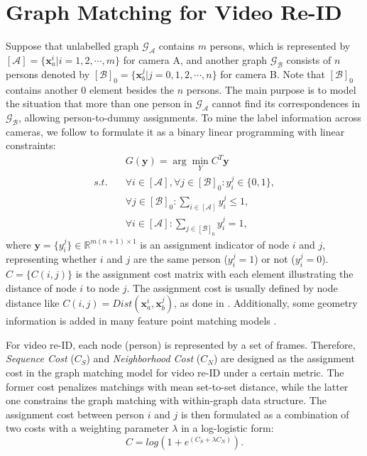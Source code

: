 \documentclass[10pt,twocolumn,letterpaper]{article}
\begin{document}
\section{Graph Matching for Video Re-ID}\label{sec:gm}
Suppose that unlabelled graph $\mathcal{G_A}$ contains $m$ persons, which is represented by $[\mathcal{A}] = \{\mathbf{x}^{i}_{a}|i = 1,2,\cdots,m\}$ for camera A, and another graph $\mathcal{G_B}$ consists of $n$ persons denoted by $[\mathcal{B}]_0 = \{\mathbf{x}^{j}_{b}|j = 0,1,2,\cdots,n\}$ for camera B. Note that $[\mathcal{B}]_0$ contains another 0 element besides the $n$ persons. The main purpose is to model the situation that more than one person in $\mathcal{G_A}$ cannot find its correspondences in $\mathcal{G_B}$, \ie allowing person-to-dummy assignments. To mine the label information across cameras, we follow \cite{iccv15joint} to formulate it as a binary linear programming with linear constraints:
\begin{equation}\label{eq:match}
\begin{split}
&G(\mathbf{y}) = \arg \mathop {\min }\limits_{Y} C^{T}\mathbf{y} \\
s.t.\quad &\forall i \in [\mathcal{A}],\forall j \in [\mathcal{B}]_{0}:y^{j}_{i}\in\{0,1\},\\
&\forall j \in [\mathcal{B}]_{0}:{\sum\limits_{i \in [\mathcal{A}]} {y_i^j \le 1} },\\
&\forall i \in [\mathcal{A}]:{\sum\limits_{j \in [\mathcal{B}]_{0}} {y_i^j = 1} },
\end{split}
\end{equation}
where $\mathbf{y}= \{y_i^j\}\in \mathbb{R}^ {m(n+1)\times 1}$ is an assignment indicator of node $i$ and $j$, representing whether $i$ and $j$ are the same person ($y_i^j =1$) or not ($y_i^j =0$). $C = \{C(i,j)\}$ is the assignment cost matrix with each element illustrating the distance of node $i$ to node $j$. The assignment cost is usually defined by node distance like $C(i,j) = Dist(\mathbf{x}^{i}_{a},\mathbf{x}^{j}_{b})$, as done in \cite{cvpr16graph}. Additionally, some geometry information is added in many feature point matching models \cite{ijcv12gm}.

For video re-ID, each node (person) is represented by a set of frames. Therefore, \textit{Sequence Cost} (${C_S}$) and \textit{Neighborhood Cost} ($C_{N}$) are designed as the assignment cost in the graph matching model for video re-ID under a certain metric. The former cost penalizes matchings with mean set-to-set distance, while the latter one constrains the graph matching with within-graph data structure. The assignment cost between person $i$ and $j$ is then formulated as a combination of two costs with a weighting parameter $\lambda$ in a log-logistic form:
\begin{equation}\label{eq:assigncost}
C = log(1+ e^ {(C_{S} + \lambda C_{N})}).
\end{equation}
\end{document}
